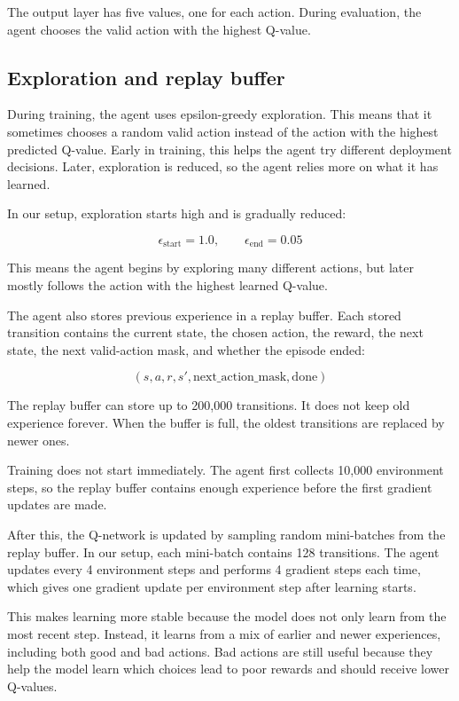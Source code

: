 \documentclass[11pt]{article}
\begin{document}
The output layer has five values, one for each action. During
evaluation, the agent chooses the valid action with the highest Q-value.

\subsection{Exploration and replay
buffer}\label{exploration-and-replay-buffer}

During training, the agent uses epsilon-greedy exploration. This means
that it sometimes chooses a random valid action instead of the action
with the highest predicted Q-value. Early in training, this helps the
agent try different deployment decisions. Later, exploration is reduced,
so the agent relies more on what it has learned.

In our setup, exploration starts high and is gradually reduced:

\[
\epsilon_{\text{start}} = 1.0,
\qquad
\epsilon_{\text{end}} = 0.05
\]

This means the agent begins by exploring many different actions, but
later mostly follows the action with the highest learned Q-value.

The agent also stores previous experience in a replay buffer. Each
stored transition contains the current state, the chosen action, the
reward, the next state, the next valid-action mask, and whether the
episode ended:

\[
(s, a, r, s', \text{next\_action\_mask}, \text{done})
\]

The replay buffer can store up to 200,000 transitions. It does not keep
old experience forever. When the buffer is full, the oldest transitions
are replaced by newer ones.

Training does not start immediately. The agent first collects 10,000
environment steps, so the replay buffer contains enough experience
before the first gradient updates are made.

After this, the Q-network is updated by sampling random mini-batches
from the replay buffer. In our setup, each mini-batch contains 128
transitions. The agent updates every 4 environment steps and performs 4
gradient steps each time, which gives one gradient update per
environment step after learning starts.

This makes learning more stable because the model does not only learn
from the most recent step. Instead, it learns from a mix of earlier and
newer experiences, including both good and bad actions. Bad actions are
still useful because they help the model learn which choices lead to
poor rewards and should receive lower Q-values.
\end{document}
